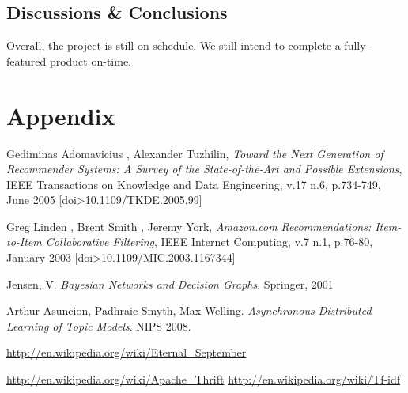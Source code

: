 \documentclass[11pt,letterpaper]{article}
\begin{document}
\subsection{Discussions \& Conclusions}
Overall, the project is still on schedule. We still intend to complete a fully-featured product on-time.

\section{Appendix}

\newpage
\newpage
\begin{thebibliography}{6}
   Gediminas Adomavicius , Alexander Tuzhilin, \textit{Toward the Next Generation of Recommender Systems: A Survey of the State-of-the-Art and Possible Extensions}, IEEE Transactions on Knowledge and Data Engineering, v.17 n.6, p.734-749, June 2005  [doi>10.1109/TKDE.2005.99]

   Greg Linden , Brent Smith , Jeremy York, \textit{Amazon.com Recommendations: Item-to-Item Collaborative Filtering}, IEEE Internet Computing, v.7 n.1, p.76-80, January 2003  [doi>10.1109/MIC.2003.1167344]

   Jensen, V. \textit{Bayesian Networks and Decision Graphs}. Springer, 2001

   Arthur Asuncion, Padhraic Smyth, Max Welling. \textit{Asynchronous Distributed Learning of Topic Models}. NIPS 2008.

   \url{http://en.wikipedia.org/wiki/Eternal\_September}

   \url{http://en.wikipedia.org/wiki/Apache\_Thrift}
   \url{http://en.wikipedia.org/wiki/Tf-idf}


\end{thebibliography}

\newpage
\appendix
\end{document}

